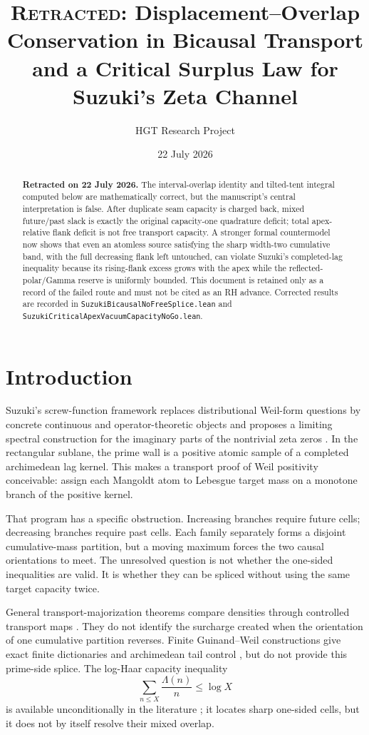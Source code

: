 \documentclass[11pt]{article}
\title{\textsc{Retracted}: Displacement--Overlap Conservation in Bicausal Transport\\
and a Critical Surplus Law for Suzuki's Zeta Channel}
\author{HGT Research Project}
\date{22 July 2026}
\begin{document}
\maketitle

\begin{abstract}
\textbf{Retracted on 22 July 2026.}
The interval-overlap identity and tilted-tent integral computed below are mathematically correct,
but the manuscript's central interpretation is false.  After duplicate seam capacity is charged
back, mixed future/past slack is exactly the original capacity-one quadrature deficit; total
apex-relative flank deficit is not free transport capacity.  A stronger formal countermodel now
shows that even an atomless source satisfying the sharp width-two cumulative band, with the full
decreasing flank left untouched, can violate Suzuki's completed-lag inequality because its
rising-flank excess grows with the apex while the reflected-polar/Gamma reserve is uniformly
bounded.  This document is retained only as a record of the failed route and must not be cited as
an RH advance.  Corrected results are recorded in
\texttt{SuzukiBicausalNoFreeSplice.lean} and
\texttt{SuzukiCriticalApexVacuumCapacityNoGo.lean}.
\end{abstract}

\section{Introduction}

Suzuki's screw-function framework replaces distributional Weil-form questions by concrete
continuous and operator-theoretic objects and proposes a limiting spectral construction for the
imaginary parts of the nontrivial zeta zeros \cite{Suzuki2026}.  In the rectangular sublane, the
prime wall is a positive atomic sample of a completed archimedean lag kernel.  This makes a
transport proof of Weil positivity conceivable: assign each Mangoldt atom to Lebesgue target mass
on a monotone branch of the positive kernel.

That program has a specific obstruction.  Increasing branches require future cells; decreasing
branches require past cells.  Each family separately forms a disjoint cumulative-mass partition,
but a moving maximum forces the two causal orientations to meet.  The unresolved question is not
whether the one-sided inequalities are valid.  It is whether they can be spliced without using
the same target capacity twice.

General transport-majorization theorems compare densities through controlled transport maps
\cite{MelbourneRoberto2021}.  They do not identify the surcharge created when the orientation of
one cumulative partition reverses.  Finite Guinand--Weil constructions give exact finite
dictionaries and archimedean tail control \cite{Groskin2026}, but do not provide this prime-side
splice.  The log-Haar capacity inequality
\[
 \sum_{n\le X}\frac{\Lambda(n)}n\le\log X
\]
is available unconditionally in the literature \cite{RamareZuniga2026}; it locates sharp
one-sided cells, but it does not by itself resolve their mixed overlap.
\end{document}

